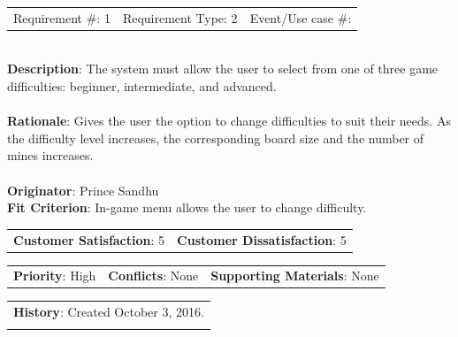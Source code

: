\documentclass[12pt, titlepage]{article}
\begin{document}
\begin{reqbox}

\begin{tabular}{lll}
Requirement \#: 1 & Requirement Type: 2 & Event/Use case \#: \\
\end{tabular} \\

\textbf{Description}:  The system must allow the user to select from one of three game difficulties:
			         beginner, intermediate, and advanced. \\ \\
\textbf{Rationale}: Gives the user the option to change difficulties to suit their needs. As the difficulty
			     level increases, the corresponding board size and the number of mines increases.\\ \\
\textbf{Originator}: Prince Sandhu \\
\textbf{Fit Criterion}: In-game menu allows the user to change difficulty.\\

\begin{tabular}{ll}
\textbf{Customer Satisfaction}: 5 & \textbf{Customer Dissatisfaction}: 5 \\
\end{tabular}

\begin{tabular}{lll}
\textbf{Priority}: High & \textbf{Conflicts}: None & \textbf{Supporting Materials}: None \\
\end{tabular}

\begin{tabular}{l}
\textbf{History}: Created October 3, 2016.\\ \\
\end{tabular}

\end{reqbox}
\end{document}
